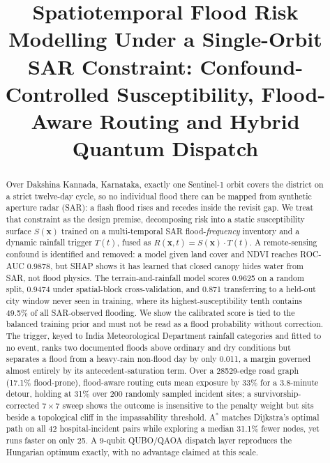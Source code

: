 \documentclass[journal]{IEEEtran}
\newcommand{\Sx}{S(\mathbf{x})}
\newcommand{\Tt}{T(t)}
\newcommand{\Rxt}{R(\mathbf{x},t)}
\begin{document}
\title{Spatiotemporal Flood Risk Modelling Under a Single-Orbit SAR Constraint:
Confound-Controlled Susceptibility, Flood-Aware Routing and Hybrid Quantum
Dispatch}

\author{}

\maketitle

\begin{abstract}
\noindent
Over Dakshina Kannada, Karnataka, exactly one Sentinel-1 orbit covers the
district on a strict twelve-day cycle, so no individual flood there can be mapped
from synthetic aperture radar (SAR): a flash flood rises and recedes inside the
revisit gap. We treat that constraint as the design premise, decomposing risk
into a static susceptibility surface $\Sx$ trained on a multi-temporal SAR
flood-\emph{frequency} inventory and a dynamic rainfall trigger $\Tt$, fused as
$\Rxt=\Sx\cdot\Tt$. A remote-sensing confound is identified and removed: a model
given land cover and NDVI reaches ROC-AUC 0.9878, but SHAP shows it has learned
that closed canopy hides water from SAR, not flood physics. The
terrain-and-rainfall model scores 0.9625 on a random split, 0.9474 under
spatial-block cross-validation, and 0.871 transferring to a held-out city window
never seen in training, where its highest-susceptibility tenth contains 49.5\% of
all SAR-observed flooding. We show the calibrated score is tied to the balanced
training prior and must not be read as a flood probability without correction.
The trigger, keyed to India Meteorological Department rainfall categories and
fitted to no event, ranks two documented floods above ordinary and dry conditions
but separates a flood from a heavy-rain non-flood day by only 0.011, a margin
governed almost entirely by its antecedent-saturation term. Over a
\num{28529}-edge road graph (17.1\% flood-prone), flood-aware routing cuts mean
exposure by 33\% for a 3.8-minute detour, holding at 31\% over 200 randomly
sampled incident sites; a survivorship-corrected $7\times7$ sweep shows the
outcome is insensitive to the penalty weight but sits beside a topological cliff
in the impassability threshold. A$^\ast$ matches Dijkstra's optimal path on all
42 hospital-incident pairs while exploring a median 31.1\% fewer nodes, yet runs
faster on only 25. A 9-qubit QUBO/QAOA dispatch layer reproduces the Hungarian
optimum exactly, with no advantage claimed at this scale.

\vspace{6pt}
\end{abstract}
\end{document}
